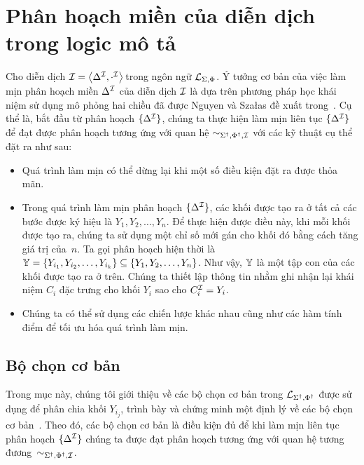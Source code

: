 \section{Phân hoạch miền của diễn dịch trong logic mô tả}

Cho diễn dịch $\mathcal{I} = \left\langle\Delta^{\mathcal{I}}, \cdot^{\mathcal{I}}\right\rangle\!$ trong ngôn ngữ $\mathcal{L}_{\Sigma,\Phi}$. Ý tưởng cơ bản của việc làm mịn phân hoạch miền $\Delta^{\mathcal{I}}$ của diễn dịch $\mathcal{I}$ là dựa trên phương pháp học khái niệm sử dụng mô phỏng hai chiều đã được Nguyen và Sza{\l}as đề xuất trong~\cite{Nguyen2013}. Cụ thể là, bắt đầu từ phân hoạch $\{\Delta^{\mathcal{I}}\}$, chúng ta thực hiện làm mịn liên tục $\{\Delta^{\mathcal{I}}\}$ để đạt được phân hoạch tương ứng với quan hệ $\sim_{\Sigma^\dag,\Phi^\dag,\mathcal{I}}$ với các kỹ thuật cụ thể đặt ra như sau:
\begin{itemize}
	\item Quá trình làm mịn có thể dừng lại khi một số điều kiện đặt ra được thỏa mãn.		
	\item Trong quá trình làm mịn phân hoạch $\{\Delta^{\mathcal{I}}\}$, các khối được tạo ra ở tất cả các bước được ký hiệu là $Y_1, Y_2, \ldots, Y_n$. Để thực hiện được điều này, khi mỗi khối được tạo ra, chúng ta sử dụng một chỉ số mới gán cho khối đó bằng cách tăng giá trị của~$n$. Ta gọi phân hoạch hiện thời là $\mathbb{Y} = \{Y_{i_1}, Y_{i_2}, \ldots, Y_{i_k}\} \subseteq \{Y_1, Y_2, \ldots, Y_n\}$. Như vậy, $\mathbb{Y}$ là một tập con của các khối được tạo ra ở trên. Chúng ta thiết lập thông tin nhằm ghi nhận lại khái niệm $C_i$ đặc trưng cho khối $Y_i$ sao cho $C_i^{\mathcal{I}} = Y_i$.
	\item Chúng ta có thể sử dụng các chiến lược khác nhau cũng như các hàm tính điểm để tối ưu hóa quá trình làm mịn.
\end{itemize}

\subsection{Bộ chọn cơ bản}
\label{sec:Chap3.BasicSelectors}
Trong mục này, chúng tôi giới thiệu về các bộ chọn cơ bản trong $\mathcal{L}_{\Sigma^\dag,\Phi^\dag}$ được sử dụng để phân chia khối $Y_{i_j}$, trình bày và chứng minh một định lý về các bộ chọn cơ bản~\cite{Tran2012}. Theo đó, các bộ chọn cơ bản là điều kiện đủ để khi làm mịn liên tục phân hoạch $\{\Delta^{\mathcal{I}}\}$ chúng ta được đạt phân hoạch tương ứng với quan hệ tương đương~$\sim_{\Sigma^\dag,\Phi^\dag,\mathcal{I}}$.
%

